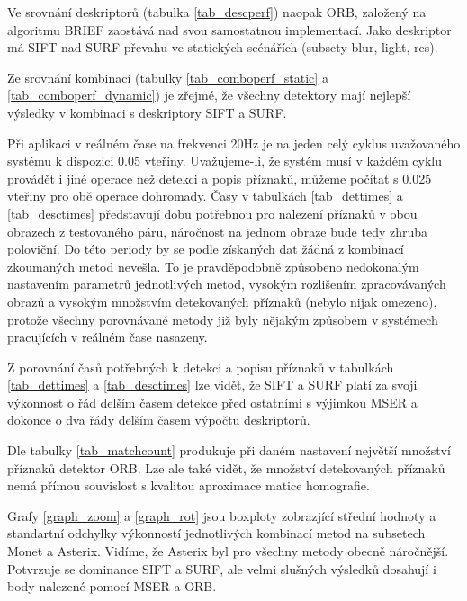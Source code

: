 

Ve srovnání deskriptorů (tabulka \ref{tab_descperf}) naopak ORB, založený na algoritmu BRIEF zaostává nad svou samostatnou implementací. Jako deskriptor má SIFT nad SURF převahu ve statických scénářích (subsety blur, light, res).



Ze srovnání kombinací (tabulky \ref{tab_comboperf_static} a \ref{tab_comboperf_dynamic}) je zřejmé, že všechny detektory mají nejlepší výsledky v kombinaci s deskriptory SIFT a SURF.



Při aplikaci v reálném čase na frekvenci 20Hz je na jeden celý cyklus uvažovaného systému k dispozici 0.05 vteřiny. Uvažujeme-li, že systém musí v každém cyklu provádět i jiné operace než detekci a popis příznaků, můžeme počítat s 0.025 vteřiny pro obě operace dohromady. Časy v tabulkách \ref{tab_dettimes} a \ref{tab_desctimes} představují dobu potřebnou pro nalezení příznaků v obou obrazech z testovaného páru, náročnost na jednom obraze bude tedy zhruba poloviční. Do této periody by se podle získaných dat žádná z kombinací zkoumaných metod nevešla. To je pravděpodobně způsobeno nedokonalým nastavením parametrů jednotlivých metod, vysokým rozlišením zpracovávaných obrazů a vysokým množstvím detekovaných příznaků (nebylo nijak omezeno), protože všechny porovnávané metody již byly nějakým způsobem v systémech pracujících v reálném čase nasazeny.

Z porovnání časů potřebných k detekci a popisu příznaků v tabulkách \ref{tab_dettimes} a \ref{tab_desctimes} lze vidět, že SIFT a SURF platí za svoji výkonnost o řád delším časem detekce před ostatními s výjimkou MSER a dokonce o dva řády delším časem výpočtu deskriptorů.



Dle tabulky \ref{tab_matchcount} produkuje při daném nastavení největší množství příznaků detektor ORB. Lze ale také vidět, že množství detekovaných příznaků nemá přímou souvislost s kvalitou aproximace matice homografie.



Grafy \ref{graph_zoom} a \ref{graph_rot} jsou boxploty zobrazjící střední hodnoty a standartní odchylky výkonností jednotlivých kombinací metod na subsetech Monet a Asterix. Vidíme, že Asterix byl pro všechny metody obecně náročnější. Potvrzuje se dominance SIFT a SURF, ale velmi slušných výsledků dosahují i body nalezené pomocí MSER a ORB.


